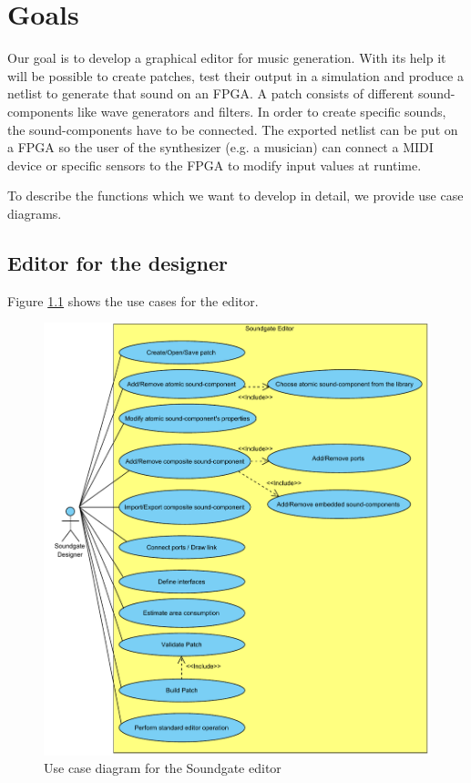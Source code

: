 \chapter{Goals}
\label{chapter:Goals}
Our goal is to develop a graphical editor for music generation. With its help it will be possible to create patches, test their output in a simulation and produce a netlist to generate that sound on an \ac{FPGA}. A patch consists of different sound-components like wave generators and filters. In order to create specific sounds, the sound-components have to be connected. The exported netlist can be put on a \ac{FPGA} so the user of the synthesizer (e.g. a musician) can connect a MIDI device or specific sensors to the \ac{FPGA} to modify input values at runtime. %

To describe the functions which we want to develop in detail, we provide use case diagrams.

\section{Editor for the designer}
\label{editor}
Figure \ref{fig:Soundgate_Designer} shows the use cases for the editor.

	\begin{figure}[!h]
		\centering
			\includegraphics[width=1\textwidth]{images/Soundgate_Designer.pdf}
		\caption{Use case diagram for the Soundgate editor}
		\label{fig:Soundgate_Designer}
	\end{figure}

